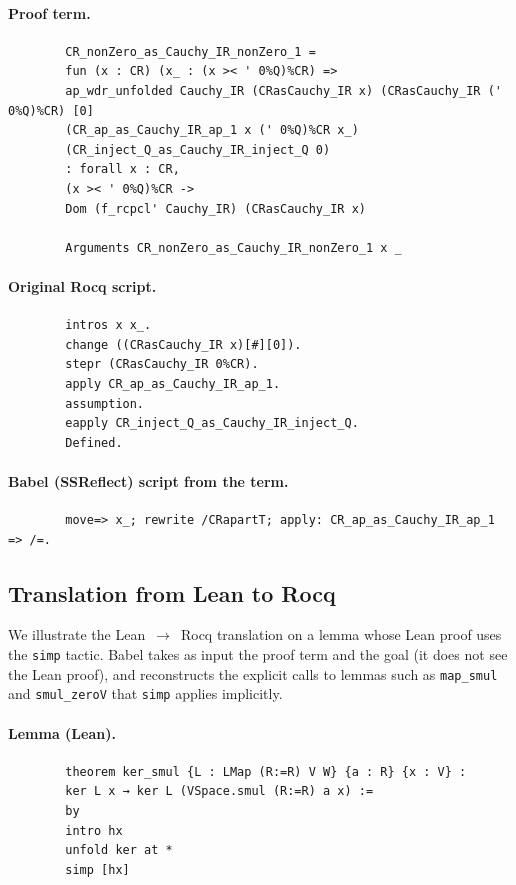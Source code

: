 \documentclass{article}
\theoremstyle{plain}
\theoremstyle{definition}
\theoremstyle{remark}
\begin{document}
	\paragraph{Proof term.}
	\begin{verbatim}
		CR_nonZero_as_Cauchy_IR_nonZero_1 =
		fun (x : CR) (x_ : (x >< ' 0%Q)%CR) =>
		ap_wdr_unfolded Cauchy_IR (CRasCauchy_IR x) (CRasCauchy_IR (' 0%Q)%CR) [0]
		(CR_ap_as_Cauchy_IR_ap_1 x (' 0%Q)%CR x_)
		(CR_inject_Q_as_Cauchy_IR_inject_Q 0)
		: forall x : CR,
		(x >< ' 0%Q)%CR ->
		Dom (f_rcpcl' Cauchy_IR) (CRasCauchy_IR x)
		
		Arguments CR_nonZero_as_Cauchy_IR_nonZero_1 x _
	\end{verbatim}
	
	\paragraph{Original Rocq script.}
	\begin{verbatim}
		intros x x_.
		change ((CRasCauchy_IR x)[#][0]).
		stepr (CRasCauchy_IR 0%CR).
		apply CR_ap_as_Cauchy_IR_ap_1.
		assumption.
		eapply CR_inject_Q_as_Cauchy_IR_inject_Q.
		Defined.
	\end{verbatim}
	
	\paragraph{Babel (SSReflect) script from the term.}
	\begin{verbatim}
		move=> x_; rewrite /CRapartT; apply: CR_ap_as_Cauchy_IR_ap_1 => /=.
	\end{verbatim}
	
	\subsection{Translation from Lean to Rocq}
	\label{app:leanrocq}
	
	We illustrate the Lean~$\to$~Rocq translation on a lemma whose Lean proof uses the \texttt{simp} tactic. Babel takes as input the proof term and the goal (it does not see the Lean proof), and reconstructs the explicit calls to lemmas such as \texttt{map\_smul} and \texttt{smul\_zeroV} 
	that \texttt{simp} applies implicitly.
	
	\paragraph{Lemma (Lean).}
	\begin{verbatim}
		theorem ker_smul {L : LMap (R:=R) V W} {a : R} {x : V} :
		ker L x → ker L (VSpace.smul (R:=R) a x) :=
		by
		intro hx
		unfold ker at *
		simp [hx]
	\end{verbatim}
	
\end{document}
